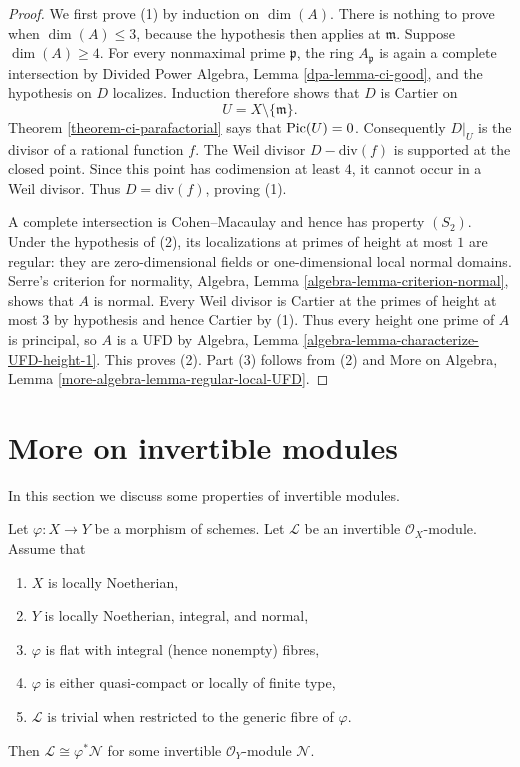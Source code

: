 \begin{proof}
We first prove (1) by induction on $\dim(A)$. There is nothing to prove when
$\dim(A)\leq 3$, because the hypothesis then applies at $\mathfrak m$.
Suppose $\dim(A)\geq 4$. For every nonmaximal prime $\mathfrak p$, the ring
$A_\mathfrak p$ is again a complete intersection by Divided Power Algebra,
Lemma \ref{dpa-lemma-ci-good}, and the hypothesis on $D$ localizes. Induction
therefore shows that $D$ is Cartier on
$$
U=X\setminus\{\mathfrak m\}.
$$
Theorem \ref{theorem-ci-parafactorial} says that $\mathop{\mathrm{Pic}}\nolimits(U)=0$. Consequently
$D|_U$ is the divisor of a rational function $f$. The Weil divisor
$D-\text{div}(f)$ is supported at the closed point. Since this point has
codimension at least $4$, it cannot occur in a Weil divisor. Thus
$D=\text{div}(f)$, proving (1).

A complete intersection is Cohen--Macaulay and hence has property $(S_2)$.
Under the hypothesis of (2), its localizations at primes of height at most
$1$ are regular: they are zero-dimensional fields or one-dimensional local
normal domains. Serre's criterion for normality, Algebra, Lemma
\ref{algebra-lemma-criterion-normal}, shows that $A$ is normal. Every Weil
divisor is Cartier at the primes of height at most $3$ by hypothesis and
hence Cartier by (1). Thus every height one prime of $A$ is principal, so
$A$ is a UFD by Algebra, Lemma
\ref{algebra-lemma-characterize-UFD-height-1}. This proves (2). Part (3)
follows from (2) and More on Algebra, Lemma
\ref{more-algebra-lemma-regular-local-UFD}.
\end{proof}






\section{More on invertible modules}
\label{section-invertible-modules}

\noindent
In this section we discuss some properties of invertible modules.

\begin{lemma}
\label{lemma-in-image-pullback}
Let $\varphi : X \to Y$ be a morphism of schemes. Let $\mathcal{L}$
be an invertible $\mathcal{O}_X$-module. Assume that
\begin{enumerate}
\item $X$ is locally Noetherian,
\item $Y$ is locally Noetherian, integral, and normal,
\item $\varphi$ is flat with integral (hence nonempty) fibres,
\item $\varphi$ is either quasi-compact or locally of finite type,
\item $\mathcal{L}$ is trivial when restricted to the generic fibre of
$\varphi$.
\end{enumerate}
Then $\mathcal{L} \cong \varphi^*\mathcal{N}$ for some invertible
$\mathcal{O}_Y$-module $\mathcal{N}$.
\end{lemma}

